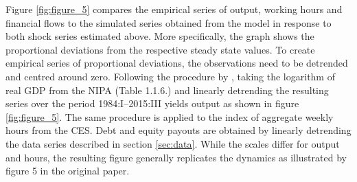 Figure \ref{fig:figure_5} compares the empirical series of output, working hours and financial flows to the simulated series obtained from the model in response to both shock series estimated above. More specifically, the graph shows the proportional deviations from the respective steady state values. To create empirical series of proportional deviations, the observations need to be detrended and centred around zero. Following the procedure by \citeauthor{JERMANNfinancial}, taking the logarithm of real GDP from the NIPA (Table 1.1.6.) and linearly detrending the resulting series over the period 1984:I--2015:III yields output as shown in figure \ref{fig:figure_5}. The same procedure is applied to the index of aggregate weekly hours from the CES. Debt and equity payouts are obtained by linearly detrending the data series described in section \ref{sec:data}. While the scales differ for output and hours, the resulting figure generally replicates the dynamics as illustrated by figure 5 in the original paper.
